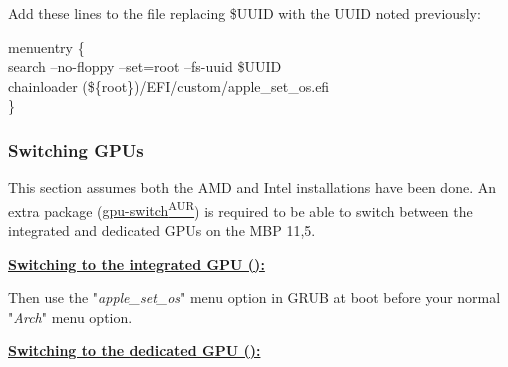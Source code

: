 \begin{blocksection}
	Add these lines to the file replacing \textcolor{codekeyword1}{\$UUID} with the UUID noted previously:\vspace*{1em}
	\begin{codeblock}
		menuentry \{\\
			\tab search --no-floppy --set=root --fs-uuid \textcolor{codekeyword1}{\$UUID}\\
			\tab chainloader (\$\{root\})/EFI/custom/apple\_set\_os.efi\\
		\}
	\end{codeblock}
\end{blocksection}

\subsubsection{Switching GPUs}

This section assumes both the AMD and Intel installations have been done. An extra package (\href{https://github.com/0xbb/gpu-switch}{gpu-switch\textsuperscript{AUR}}) is required to be able to switch between the integrated and dedicated GPUs on the MBP 11,5.


\vspace*{1em}
\textbf{\textcolor{textgrey}{\uline{Switching to the integrated GPU ():}}}


Then use the "\textit{apple\_set\_os}" menu option in GRUB at boot before your normal "\textit{Arch}" menu option.

\vspace*{1em}
\textbf{\textcolor{textgrey}{\uline{Switching to the dedicated GPU ():}}}


